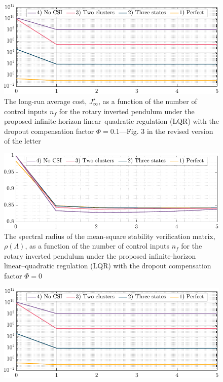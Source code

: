 {\begin{figure}[h!]
\begin{center}
\end{center}
\end{figure}
\begin{figure}[h!]
\begin{center}
\includegraphics[width=0.76\columnwidth]{../cost-cntrl-a.pdf}
\caption{The long-run average cost, $J_{\infty}^{\star}$, as a function of the number of control inputs $n_f$ for the rotary inverted pendulum under the proposed infinite-horizon linear–quadratic regulation (LQR) with the dropout compensation factor $\mathit{\Phi}=0.1$—Fig. 3 in the revised version of the letter}\label{fig:cost-cntrl-a}
\end{center}
\end{figure}
\begin{figure}[h!]
\begin{center}
\includegraphics[width=0.76\columnwidth]{stability-cntrl-0.pdf}
\caption{The spectral radius of the mean-square stability verification matrix, $\rho(\mathit{\Lambda})$, as a function of the number of control inputs $n_f$ for the rotary inverted pendulum under the proposed infinite-horizon linear–quadratic regulation (LQR) with the dropout compensation factor $\mathit{\Phi}=0$}\label{fig:stability-coeff-0}
\end{center}
\end{figure}
\newpage
\begin{figure}[h!]
\begin{center}
\includegraphics[width=0.76\columnwidth]{cost-cntrl-0.pdf}

\end{center}
\end{figure}}
